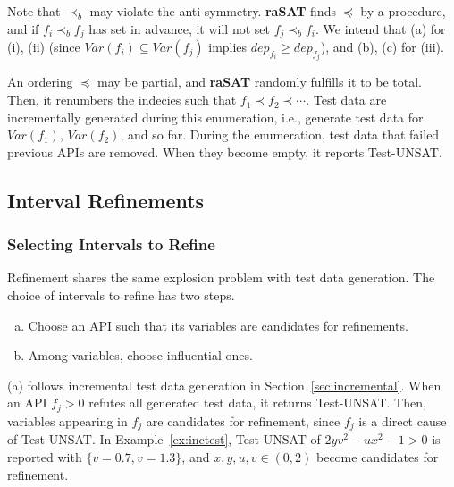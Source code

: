\documentclass[runningheads,a4paper,oribibl]{llncs}
\newcommand{\suppress}[1]{} %
\begin{document}
Note that $\prec_{b}$ may violate the anti-symmetry. {\bf raSAT} finds $\preceq$ by a procedure, 
and if $f_i \prec_{b} f_j$ has set in advance, it will not set $f_j \prec_{b} f_i$. 
We intend that 
(a) for (i), (ii) (since $Var(f_i) \subseteq Var(f_j)$ implies $dep_{f_i} \geq dep_{f_j}$), and 
(b), (c) for (iii). 

An ordering $\preceq$ may be partial, and {\bf raSAT} randomly fulfills it to be total. 
Then, it renumbers the indecies such that $f_1 \prec f_2 \prec \cdots$. 
Test data are incrementally generated during this enumeration, i.e., generate test data 
for $Var(f_1)$, $Var(f_2)$, and so far. 
During the enumeration, test data that failed previous APIs are removed. 
When they become empty, it reports Test-UNSAT. 



\subsection{Interval Refinements} \label{sec:refinement}

\suppress{
We need to consider the choice of intervals to decompose, and 
how to decompose an interval. 
Similar to explosion of test data generation, interval decomposition may cause exponential 
explosion of boxes. 
Certain strategies to choose variables to apply interval decompositions, and 
how to decompose intervals are crucial in practice. 
}

\medskip
\subsubsection{Selecting Intervals to Refine}  \label{sec:intervaldecomp}

Refinement shares the same explosion problem with test data generation. 
The choice of intervals to refine has two steps. 
\begin{enumerate}[(a)]
\item Choose an API such that its variables are candidates for refinements. 
\item Among variables, choose influential ones. 
\end{enumerate}

(a) follows incremental test data generation in Section~\ref{sec:incremental}. 
When an API $f_j > 0$ refutes all generated test data, it returns Test-UNSAT. 
Then, variables appearing in $f_j$ are candidates for refinement, 
since $f_j$ is a direct cause of Test-UNSAT. In Example~\ref{ex:inctest}, 
Test-UNSAT of $2yv^2 - ux^2 - 1 > 0$ is reported with $\{v=0.7, v=1.3\}$, 
and $x,y,u,v \in (0,2)$ become candidates for refinement. 
\end{document}
